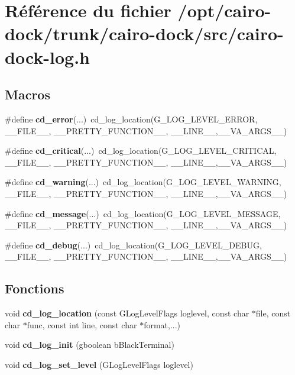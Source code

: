 \section{Référence du fichier /opt/cairo-dock/trunk/cairo-dock/src/cairo-dock-log.h}
\label{cairo-dock-log_8h}
\subsection*{Macros}
\begin{CompactItemize}
\item 
\#define {\bf cd\_\-error}(...)~cd\_\-log\_\-location(G\_\-LOG\_\-LEVEL\_\-ERROR, \_\-\_\-FILE\_\-\_\-, \_\-\_\-PRETTY\_\-FUNCTION\_\-\_\-, \_\-\_\-LINE\_\-\_\-,\_\-\_\-VA\_\-ARGS\_\-\_\-)
\item 
\#define {\bf cd\_\-critical}(...)~cd\_\-log\_\-location(G\_\-LOG\_\-LEVEL\_\-CRITICAL, \_\-\_\-FILE\_\-\_\-, \_\-\_\-PRETTY\_\-FUNCTION\_\-\_\-, \_\-\_\-LINE\_\-\_\-,\_\-\_\-VA\_\-ARGS\_\-\_\-)
\item 
\#define {\bf cd\_\-warning}(...)~cd\_\-log\_\-location(G\_\-LOG\_\-LEVEL\_\-WARNING, \_\-\_\-FILE\_\-\_\-, \_\-\_\-PRETTY\_\-FUNCTION\_\-\_\-, \_\-\_\-LINE\_\-\_\-,\_\-\_\-VA\_\-ARGS\_\-\_\-)
\item 
\#define {\bf cd\_\-message}(...)~cd\_\-log\_\-location(G\_\-LOG\_\-LEVEL\_\-MESSAGE, \_\-\_\-FILE\_\-\_\-, \_\-\_\-PRETTY\_\-FUNCTION\_\-\_\-, \_\-\_\-LINE\_\-\_\-,\_\-\_\-VA\_\-ARGS\_\-\_\-)
\item 
\#define {\bf cd\_\-debug}(...)~cd\_\-log\_\-location(G\_\-LOG\_\-LEVEL\_\-DEBUG, \_\-\_\-FILE\_\-\_\-, \_\-\_\-PRETTY\_\-FUNCTION\_\-\_\-, \_\-\_\-LINE\_\-\_\-,\_\-\_\-VA\_\-ARGS\_\-\_\-)
\end{CompactItemize}
\subsection*{Fonctions}
\begin{CompactItemize}
\item 
void {\bf cd\_\-log\_\-location} (const GLogLevelFlags loglevel, const char $\ast$file, const char $\ast$func, const int line, const char $\ast$format,...)
\item 
void {\bf cd\_\-log\_\-init} (gboolean bBlackTerminal)
\item 
void {\bf cd\_\-log\_\-set\_\-level} (GLogLevelFlags loglevel)
\end{CompactItemize}
